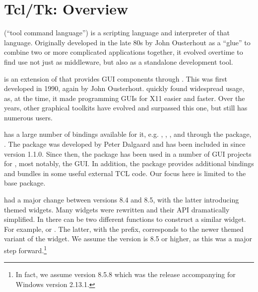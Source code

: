  
\newcommand{\Event}[1]{$<$#1$>$}
\newcommand{\VirtualEvent}[1]{$<<$#1$>>$}



\chapter{Tcl/Tk: Overview}
\label{sec:tcltk:overview}



\TCL\/ (``tool command language'') is a scripting language and
interpreter of that language.  Originally developed in the late 80s by
John Ousterhout as a ``glue'' to combine two or more complicated
applications together, it evolved overtime to find use not just as
middleware, but also as a standalone development tool.

\TK{} is an extension of \TCL\/ that provides GUI components through \TCL.
This was first developed in 1990, again by John Ousterhout. \TK\/
quickly found widespread usage, as, at the time, it made programming GUIs for X11
easier and faster. Over the years, other graphical toolkits have
evolved and surpassed this one, but \TK\/ still has numerous users.

\TK\/ has a large number of bindings available for it,
e.g. , , , and through
the  package, \R. The  package was developed by
Peter Dalgaard and has been included in \R\/ since version 1.1.0. Since then,
the package has been used in a number of GUI projects for \R, most
notably, the  GUI. In addition, the  package
provides additional bindings and bundles in some useful external TCL
code. Our focus here is limited to the base  package.

\TK\/ had a major change between versions 8.4 and 8.5, with the latter
introducing themed widgets. Many widgets were rewritten and their API
dramatically simplified. In  there can be two different
functions to construct a similar widget. For example,
 or . The latter, with the
 prefix, corresponds to the newer themed variant of the
widget. We assume the \TK\/ version is 8.5 or higher, as this was a
major step forward.\footnote{In fact, we assume version 8.5.8 which
  was the release accompanying \R{} for Windows version 2.13.1.}

